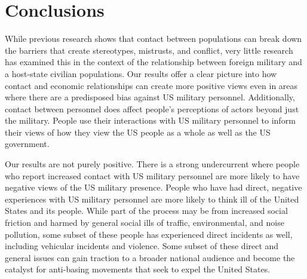 \section*{Conclusions}

While previous research shows that contact between populations can break down the barriers that create stereotypes, mistrusts, and conflict, very little research has examined this in the context of the relationship between foreign military and a host-state civilian populations. Our results offer a clear picture into how contact and economic relationships can create more positive views even in areas where there are a predisposed bias against US military personnel. Additionally, contact between personnel does affect people's perceptions of actors beyond just the military. People use their interactions with US military personnel to inform their views of how they view the US people as a whole as well as the US government.

Our results are not purely positive. There is a strong undercurrent where people who report increased contact with US military personnel are more likely to have negative views of the US military presence. People who have had direct, negative experiences with US military personnel are more likely to think ill of the United States and its people. While part of the process may be from increased social friction and harmed by general social ills of traffic, environmental, and noise pollution, some subset of these people has experienced direct incidents as well, including vehicular incidents and violence. Some subset of these direct and general issues can gain traction to a broader national audience and become the catalyst for anti-basing movements that seek to expel the United States.

